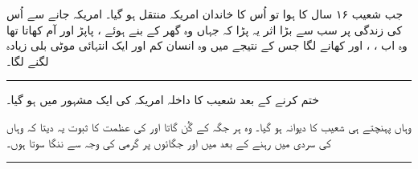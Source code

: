 \documentclass{article}
\begin{document}
جب شعیب ۱۶ سال کا ہوا تو اُس کا خاندان امریکہ منتقل ہو گیا۔ امریکہ جانے سے اُس کی زندگی پر سب سے بڑا اثر یہ پڑا کہ جہاں وہ گھر کے بنے ہوئے ، پاپڑ اور آم کھاتا تھا وہ اب ، ، اور  کھانے لگا جس کے نتیجے میں وہ انسان کم اور ایک انتہائی موٹی بلی زیادہ لگنے لگا۔  


\rule{\textwidth}{1pt}

 ختم کرنے کے بعد شعیب کا داخلہ امریکہ کی ایک مشہور  میں ہو گیا۔ 

وہاں پہنچتے ہی شعیب  کا دیوانہ ہو گیا۔ وہ ہر جگہ  کے گُن گاتا اور  کی عظمت کا ثبوت یہ دیتا کہ وہاں کی سردی میں رہنے کے بعد میں اور جگائوں پر گرمی کی وجہ سے ننگا سوتا ہوں۔ 


\rule{\textwidth}{1pt}
\end{document}
